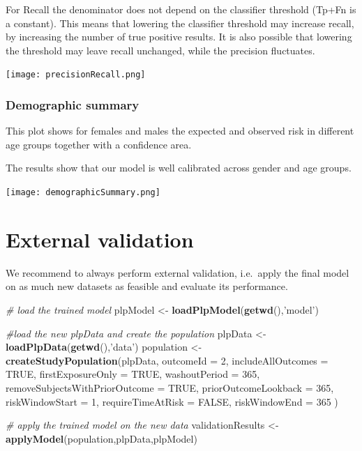 \documentclass[]{article}
\newenvironment{Shaded}{\begin{snugshade}}{\end{snugshade}}
\newcommand{\KeywordTok}[1]{\textcolor[rgb]{0.13,0.29,0.53}{\textbf{#1}}}
\newcommand{\DataTypeTok}[1]{\textcolor[rgb]{0.13,0.29,0.53}{#1}}
\newcommand{\DecValTok}[1]{\textcolor[rgb]{0.00,0.00,0.81}{#1}}
\newcommand{\StringTok}[1]{\textcolor[rgb]{0.31,0.60,0.02}{#1}}
\newcommand{\CommentTok}[1]{\textcolor[rgb]{0.56,0.35,0.01}{\textit{#1}}}
\newcommand{\OtherTok}[1]{\textcolor[rgb]{0.56,0.35,0.01}{#1}}
\newcommand{\NormalTok}[1]{#1}
\begin{document}
For Recall the denominator does not depend on the classifier threshold
(Tp+Fn is a constant). This means that lowering the classifier threshold
may increase recall, by increasing the number of true positive results.
It is also possible that lowering the threshold may leave recall
unchanged, while the precision fluctuates.

\texttt{[image: precisionRecall.png]}

\newpage

\subsubsection{Demographic summary}\label{demographic-summary}

This plot shows for females and males the expected and observed risk in
different age groups together with a confidence area.

The results show that our model is well calibrated across gender and age
groups.

\texttt{[image: demographicSummary.png]}

\newpage

\section{External validation}\label{external-validation}

We recommend to always perform external validation, i.e.~apply the final
model on as much new datasets as feasible and evaluate its performance.

\begin{Shaded}
\begin{Highlighting}[]
\CommentTok{# load the trained model}
\NormalTok{plpModel <-}\StringTok{ }\KeywordTok{loadPlpModel}\NormalTok{(}\KeywordTok{getwd}\NormalTok{(),}\StringTok{'model'}\NormalTok{)}

\CommentTok{#load the new plpData and create the population}
\NormalTok{plpData <-}\StringTok{ }\KeywordTok{loadPlpData}\NormalTok{(}\KeywordTok{getwd}\NormalTok{(),}\StringTok{'data'}\NormalTok{)}
\NormalTok{population <-}\StringTok{ }\KeywordTok{createStudyPopulation}\NormalTok{(plpData, }
\DataTypeTok{outcomeId =} \DecValTok{2}\NormalTok{, }
\DataTypeTok{includeAllOutcomes =} \OtherTok{TRUE}\NormalTok{, }
\DataTypeTok{firstExposureOnly =} \OtherTok{TRUE}\NormalTok{, }
\DataTypeTok{washoutPeriod =} \DecValTok{365}\NormalTok{, }
\DataTypeTok{removeSubjectsWithPriorOutcome =} \OtherTok{TRUE}\NormalTok{, }
\DataTypeTok{priorOutcomeLookback =} \DecValTok{365}\NormalTok{,}
\DataTypeTok{riskWindowStart =} \DecValTok{1}\NormalTok{,}
\DataTypeTok{requireTimeAtRisk =} \OtherTok{FALSE}\NormalTok{,}
\DataTypeTok{riskWindowEnd =} \DecValTok{365}
\NormalTok{)}

\CommentTok{# apply the trained model on the new data}
\NormalTok{validationResults <-}\StringTok{ }\KeywordTok{applyModel}\NormalTok{(population,plpData,plpModel)}
\end{Highlighting}
\end{Shaded}
\end{document}
